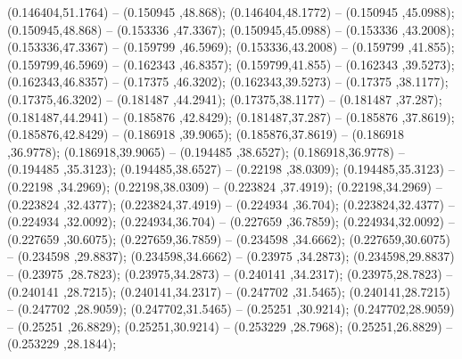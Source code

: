  (0.146404,51.1764) -- (0.150945 ,48.868);
 (0.146404,48.1772) -- (0.150945 ,45.0988);
 (0.150945,48.868) -- (0.153336 ,47.3367);
 (0.150945,45.0988) -- (0.153336 ,43.2008);
 (0.153336,47.3367) -- (0.159799 ,46.5969);
 (0.153336,43.2008) -- (0.159799 ,41.855);
 (0.159799,46.5969) -- (0.162343 ,46.8357);
 (0.159799,41.855) -- (0.162343 ,39.5273);
 (0.162343,46.8357) -- (0.17375 ,46.3202);
 (0.162343,39.5273) -- (0.17375 ,38.1177);
 (0.17375,46.3202) -- (0.181487 ,44.2941);
 (0.17375,38.1177) -- (0.181487 ,37.287);
 (0.181487,44.2941) -- (0.185876 ,42.8429);
 (0.181487,37.287) -- (0.185876 ,37.8619);
 (0.185876,42.8429) -- (0.186918 ,39.9065);
 (0.185876,37.8619) -- (0.186918 ,36.9778);
 (0.186918,39.9065) -- (0.194485 ,38.6527);
 (0.186918,36.9778) -- (0.194485 ,35.3123);
 (0.194485,38.6527) -- (0.22198 ,38.0309);
 (0.194485,35.3123) -- (0.22198 ,34.2969);
 (0.22198,38.0309) -- (0.223824 ,37.4919);
 (0.22198,34.2969) -- (0.223824 ,32.4377);
 (0.223824,37.4919) -- (0.224934 ,36.704);
 (0.223824,32.4377) -- (0.224934 ,32.0092);
 (0.224934,36.704) -- (0.227659 ,36.7859);
 (0.224934,32.0092) -- (0.227659 ,30.6075);
 (0.227659,36.7859) -- (0.234598 ,34.6662);
 (0.227659,30.6075) -- (0.234598 ,29.8837);
 (0.234598,34.6662) -- (0.23975 ,34.2873);
 (0.234598,29.8837) -- (0.23975 ,28.7823);
 (0.23975,34.2873) -- (0.240141 ,34.2317);
 (0.23975,28.7823) -- (0.240141 ,28.7215);
 (0.240141,34.2317) -- (0.247702 ,31.5465);
 (0.240141,28.7215) -- (0.247702 ,28.9059);
 (0.247702,31.5465) -- (0.25251 ,30.9214);
 (0.247702,28.9059) -- (0.25251 ,26.8829);
 (0.25251,30.9214) -- (0.253229 ,28.7968);
 (0.25251,26.8829) -- (0.253229 ,28.1844);
